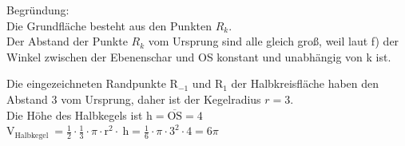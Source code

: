 \documentclass[10pt]{article}
\begin{document}
Begründung:\\
Die Grundfläche besteht aus den Punkten $R_{k}$.\\
Der Abstand der Punkte $R_{k}$ vom Ursprung sind alle gleich groß, weil laut f) der Winkel zwischen der Ebenenschar und OS konstant und unabhängig von k ist.

Die eingezeichneten Randpunkte $\mathrm{R}_{-1}$ und $\mathrm{R}_{1}$ der Halbkreisfläche haben den Abstand 3 vom Ursprung, daher ist der Kegelradius $r=3$.\\
Die Höhe des Halbkegels ist $\mathrm{h}=\overline{\mathrm{OS}}=4$\\
$\mathrm{V}_{\text {Halbkegel }}=\frac{1}{2} \cdot \frac{1}{3} \cdot \pi \cdot \mathrm{r}^{2} \cdot \mathrm{~h}=\frac{1}{6} \cdot \pi \cdot 3^{2} \cdot 4=6 \pi$
\end{document}
